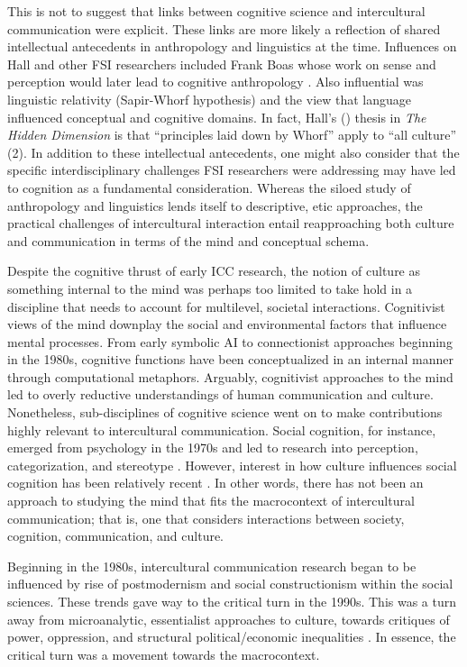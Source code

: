 This is not to suggest that links between cognitive science and intercultural communication were explicit. These links are more likely a reflection of shared intellectual antecedents in anthropology and linguistics at the time. Influences on Hall and other FSI researchers included Frank Boas whose work on sense and perception would later lead to cognitive anthropology \citep[2021]{Colby1996a, Cole2013a, Shore1996a}. Also influential was linguistic relativity (Sapir-Whorf hypothesis) and the view that language influenced conceptual and cognitive domains. In fact, Hall's (\citeyear{Hall1966a}) thesis in \textit{The Hidden Dimension} is that ``principles laid down by Whorf'' apply to ``all culture'' (2). In addition to these intellectual antecedents, one might also consider that the specific interdisciplinary challenges FSI researchers were addressing may have led to cognition as a fundamental consideration. Whereas the siloed study of anthropology and linguistics lends itself to descriptive, etic approaches, the practical challenges of intercultural interaction entail reapproaching both culture and communication in terms of the mind and conceptual schema.

Despite the cognitive thrust of early ICC research, the notion of culture as something internal to the mind was perhaps too limited to take hold in a discipline that needs to account for multilevel, societal interactions. Cognitivist views of the mind downplay the social and environmental factors that influence mental processes. From early symbolic AI to connectionist approaches beginning in the 1980s, cognitive functions have been conceptualized in an internal manner through computational metaphors. Arguably, cognitivist approaches to the mind led to overly reductive understandings of human communication and culture. Nonetheless, sub-disciplines of cognitive science went on to make contributions highly relevant to intercultural communication. Social cognition, for instance, emerged from psychology in the 1970s and led to research into perception, categorization, and stereotype \citep{Augoustinos1995a}. However, interest in how culture influences social cognition has been relatively recent \citep[e.g.,][]{Aronson2010}. In other words, there has not been an approach to studying the mind that fits the macrocontext of intercultural communication; that is, one that considers interactions between society, cognition, communication, and culture.

Beginning in the 1980s, intercultural communication research began to be influenced by rise of postmodernism and social constructionism within the social sciences. These trends gave way to the critical turn in the 1990s. This was a turn away from microanalytic, essentialist approaches to culture, towards critiques of power, oppression, and structural political/economic inequalities \citep{Moon2011a, Halualani2009a}. In essence, the critical turn was a movement towards the macrocontext.

